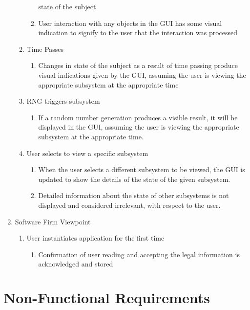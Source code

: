 \documentclass[]{article}
\begin{document}
\begin{enumerate}
\begin{enumerate}
\begin{enumerate}
			state of the subject
			\item User interaction with any objects in the GUI has some visual indication to signify to the user that the interaction was processed
		\end{enumerate}
		\item Time Passes
		\begin{enumerate}
		    \item Changes in state of the subject as a result of time passing produce visual indications given by the GUI, assuming the user is viewing the
		    appropriate subsystem at the appropriate time
		\end{enumerate}
		\item RNG triggers subsystem
		\begin{enumerate}
		    \item If a random number generation produces a visible result, it will be displayed in the GUI, assuming the user is viewing the
		    appropriate subsystem at the appropriate time.
		\end{enumerate}
		\item User selects to view a specific subsystem
		\begin{enumerate}
		    \item When the user selects a different subsystem to be viewed, the GUI is updated to show the details of the state of the given subsystem.
		    \item Detailed information about the state of other subsystems is not displayed and considered irrelevant, with respect to the user.
		\end{enumerate}
	\end{enumerate}
	\item Software Firm Viewpoint
	\begin{enumerate}
	    \item User instantiates application for the first time
	    \begin{enumerate}
	        \item Confirmation of user reading and accepting the legal information is acknowledged and stored
	    \end{enumerate}
	\end{enumerate}
\end{enumerate}


\section{Non-Functional Requirements}
\label{sec:non-functional_requirements}
\end{document}
